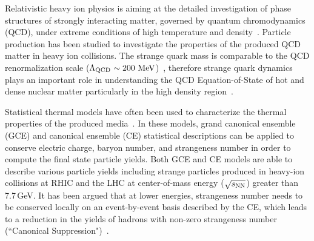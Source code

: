\documentclass[%
 reprint,	
showpacs,
 amsmath,amssymb,
 aps,
 superscriptaddress,
]{revtex4-1}
\begin{document}
\maketitle


Relativistic heavy ion physics is aiming at the detailed investigation of phase structures of strongly interacting matter, governed by quantum chromodynamics (QCD), under extreme conditions of high temperature and density~\cite{akiba2015hot,Busza_ARNPS,StarWhitePaper}. Particle production has been studied to investigate the properties of the produced QCD matter in heavy ion collisions. 
The strange quark mass %
is comparable to the QCD renormalization scale ($\Lambda_{\rm{QCD}}$\,$\sim\textup{200 MeV}$)~\cite{Rafelski:1982pu,Koch:1986ud}, 
therefore strange quark dynamics plays an important role in understanding the QCD Equation-of-State of hot and dense nuclear matter particularly in the high density region~\cite{KO_sQM17,Danielewicz1592,Tetyana_ICNN,KO.PhysRevLett.55.2661,HADES.Ks2019457,CASSING.openCharm.2001753}. 

Statistical thermal models have often been used to characterize the thermal properties of the produced media~\cite{Andronic_2018Naure,Cleymans:1992zc,Becattini:1997ii,Florkowski:2001fp,Redlich_CE}. In these models, grand canonical ensemble (GCE) and canonical ensemble (CE) statistical descriptions can be applied to conserve electric charge, baryon number, and strangeness number in order to compute the final state particle yields. Both GCE and CE models are able to describe various particle yields including strange particles produced in heavy-ion collisions at RHIC and the LHC at center-of-mass energy ($\sqrt{s_{\rm NN}}$) greater than 7.7\,GeV. It has been argued that at lower energies, strangeness number needs to be conserved locally on an event-by-event basis described by the CE, which leads to a reduction in the yields of hadrons with non-zero strangeness number (``Canonical Suppression")~\cite{Redlich:2001kb}.
\end{document}
